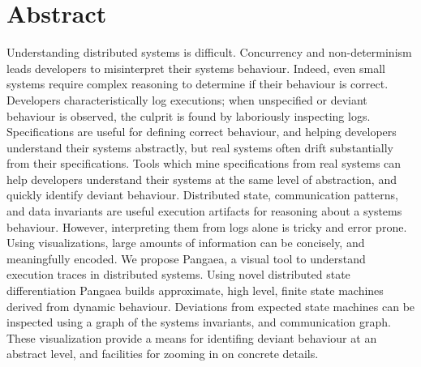 
\section{Abstract}
\label{sec:abstract}


Understanding distributed systems is difficult. Concurrency and
non-determinism leads developers to misinterpret their systems
behaviour. Indeed, even small systems require complex reasoning to
determine if their behaviour is correct.  Developers
characteristically log executions; when unspecified or deviant
behaviour is observed, the culprit is found by laboriously inspecting
logs. Specifications are useful for defining correct behaviour, and
helping developers understand their systems abstractly, but real
systems often drift substantially from their specifications. Tools
which mine specifications from real systems can help developers
understand their systems at the same level of abstraction, and quickly
identify deviant behaviour.  Distributed state, communication
patterns, and data invariants are useful execution artifacts for
reasoning about a systems behaviour.  However, interpreting them from
logs alone is tricky and error prone.  Using visualizations, large
amounts of information can be concisely, and meaningfully encoded.  We
propose Pangaea, a visual tool to understand execution traces in
distributed systems.  Using novel distributed state differentiation
Pangaea builds approximate, high level, finite state machines derived
from dynamic behaviour. Deviations from expected state machines can be
inspected using a graph of the systems invariants, and communication
graph. These visualization provide a means for identifing deviant
behaviour at an abstract level, and facilities for zooming in on
concrete details.
